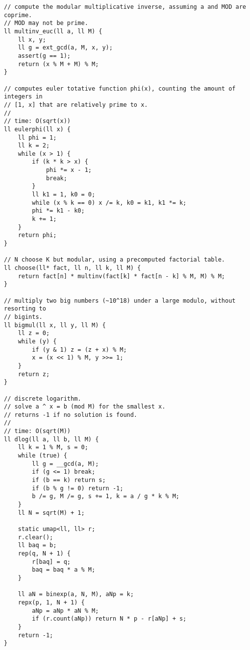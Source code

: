 \documentclass[twoside]{article}
\begin{document}
\begin{multicols*}{2}
\begin{verbatim}
// compute the modular multiplicative inverse, assuming a and MOD are coprime.
// MOD may not be prime.
ll multinv_euc(ll a, ll M) {
    ll x, y;
    ll g = ext_gcd(a, M, x, y);
    assert(g == 1);
    return (x % M + M) % M;
}

// computes euler totative function phi(x), counting the amount of integers in
// [1, x] that are relatively prime to x.
//
// time: O(sqrt(x))
ll eulerphi(ll x) {
    ll phi = 1;
    ll k = 2;
    while (x > 1) {
        if (k * k > x) {
            phi *= x - 1;
            break;
        }
        ll k1 = 1, k0 = 0;
        while (x % k == 0) x /= k, k0 = k1, k1 *= k;
        phi *= k1 - k0;
        k += 1;
    }
    return phi;
}

// N choose K but modular, using a precomputed factorial table.
ll choose(ll* fact, ll n, ll k, ll M) {
    return fact[n] * multinv(fact[k] * fact[n - k] % M, M) % M;
}

// multiply two big numbers (~10^18) under a large modulo, without resorting to
// bigints.
ll bigmul(ll x, ll y, ll M) {
    ll z = 0;
    while (y) {
        if (y & 1) z = (z + x) % M;
        x = (x << 1) % M, y >>= 1;
    }
    return z;
}

// discrete logarithm.
// solve a ^ x = b (mod M) for the smallest x.
// returns -1 if no solution is found.
//
// time: O(sqrt(M))
ll dlog(ll a, ll b, ll M) {
    ll k = 1 % M, s = 0;
    while (true) {
        ll g = __gcd(a, M);
        if (g <= 1) break;
        if (b == k) return s;
        if (b % g != 0) return -1;
        b /= g, M /= g, s += 1, k = a / g * k % M;
    }
    ll N = sqrt(M) + 1;

    static umap<ll, ll> r;
    r.clear();
    ll baq = b;
    rep(q, N + 1) {
        r[baq] = q;
        baq = baq * a % M;
    }

    ll aN = binexp(a, N, M), aNp = k;
    repx(p, 1, N + 1) {
        aNp = aNp * aN % M;
        if (r.count(aNp)) return N * p - r[aNp] + s;
    }
    return -1;
}
\end{verbatim}

{
}
\end{multicols*}
\end{document}

